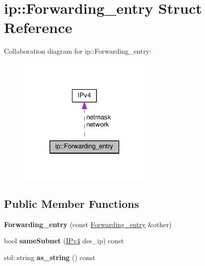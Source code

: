 \hypertarget{structip_1_1Forwarding__entry}{}\section{ip\+:\+:Forwarding\+\_\+entry Struct Reference}
\label{structip_1_1Forwarding__entry}


Collaboration diagram for ip\+:\+:Forwarding\+\_\+entry\+:\nopagebreak
\begin{figure}[H]
\begin{center}
\leavevmode
\includegraphics[width=185pt]{structip_1_1Forwarding__entry__coll__graph}
\end{center}
\end{figure}
\subsection*{Public Member Functions}
\begin{DoxyCompactItemize}
\item 
{\bfseries Forwarding\+\_\+entry} (const \hyperlink{structip_1_1Forwarding__entry}{Forwarding\+\_\+entry} \&other)\hypertarget{structip_1_1Forwarding__entry_a9cdd6c01091d718a32a11342c3998f9f}{}\label{structip_1_1Forwarding__entry_a9cdd6c01091d718a32a11342c3998f9f}

\item 
bool {\bfseries same\+Subnet} (\hyperlink{structIPv4}{I\+Pv4} des\+\_\+ip) const \hypertarget{structip_1_1Forwarding__entry_a15177e8af63ffd9d41a72a55abfcbb58}{}\label{structip_1_1Forwarding__entry_a15177e8af63ffd9d41a72a55abfcbb58}

\item 
std\+::string {\bfseries as\+\_\+string} () const \hypertarget{structip_1_1Forwarding__entry_a7b005eaf733338c728b9e63c00a84668}{}\label{structip_1_1Forwarding__entry_a7b005eaf733338c728b9e63c00a84668}

\end{DoxyCompactItemize}
